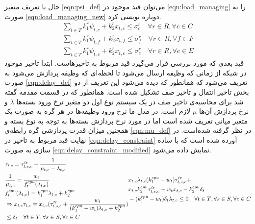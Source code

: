 	حال با تعریف متغیر \cref{eqn:psi_def} می‌توان قید موجود در \cref{eqn:load_managing} را به صورت \cref{eqn:load_managing_new} دوباره نویسی کرد. 
	\begin{subequations}\label{eqn:load_managing_new}
		\begin{align}
		\sum_{t \in T}k_1^r\psi_{t,c}+k_2^rx_{t,c} \le \sigma_c^r \quad \forall{r \in R}, \forall{c \in C} \\
		\sum_{t \in T}k_1^r\psi_{t,f}+k_2^rx_{t,f} \le \sigma_f^r \quad \forall{r \in R}, \forall{f \in F} \\
		\sum_{t \in T}k_1^r\psi_{t,e}+k_2^rx_{t,e} \le \sigma_e^r \quad \forall{r \in R}, \forall{e \in E}
		\end{align}
	\end{subequations}
	قید بعدی که مورد بررسی قرار می‌گیرد قید مربوط به تاخیرهاست. ابتدا تاخیر موجود در شبکه از زمانی که وظیفه ارسال می‌شود تا لحظه‌ای که وظیفه پردازش می‌شود به صورت \cref{eqn:delay_def} تعریف می‌شود که همانطور که دیده می‌شود این تعریف از دو بخش تاخیر انتقال و تاخیر صف تشکیل شده است. 
همانطور که در قسمت مقدمه گفته شد برای محاسبه‌ی تاخیر صف در یک سیستم نوع اول دو متغیر نرخ ورود بسته‌ها $\lambda$ و نرخ پردازش آن‌ها $\mu$ لازم است. در مدل ما نرخ ورود وظیفه‌ها در هر گره به صورت یک متغیر میانی تغریف شده است اما در مورد نرخ پردازش بسته‌ها به توجه به نوع بسته و همچنین میزان قدرت پردازشی گره رابطه‌ی \cref{eqn:mu_def} در نظر گرفته شده‌است. 
	در نهایت قید مربوط به تاخیر در \cref{eqn:delay_constraint} آورده شده است که با ساده سازی به صورت \cref{eqn:delay_constraint_modified} نمایش داده می‌شود. 
	\begin{subequations}\label{eqn:delay_def}
		\begin{align}
		&\tau_{t,c} = \tau_{t,s,c}^{tr} + \frac{1}{\mu_{t,c}-\lambda_{t,c}} \\
		&\frac{1}{\mu_{t,c}} = \frac{w_t}{f_t^{cpu}(\lambda_{t,c})} \label{eqn:mu_def}\\
		&f_t^{cpu}(\lambda_{t,c}) = k_1^{cpu}\lambda_{t,c}+k_2^{cpu} \\
		&\notag\Rightarrow x_{t,c} \tau_{t,c} = x_{t,c} (\tau_{t,s,c}^{tr} + \frac{w_t}{(k_1^{cpu}-w_t)\lambda_{t,c} + k_2^{cpu}}) \\
		&\le \delta_t \quad \forall{t \in T}, \forall{s \in S}, \forall{c \in C} \label{eqn:delay_constraint}
		\end{align}
		\begin{align}\label{eqn:delay_constraint_modified}
		&\notag x_{t,c}\lambda_{t,c}(k_1^{cpu}-w_t)\tau^{tr}_{t,s,c} + \\ 
		&\notag x_{t,c}k_2^{cpu}\tau_{t,s,c}^{tr}+w_t x_{t,c}-k_2^{cpu}\delta_t \\ &-(k_1^{cpu}-w_t)\delta_t\lambda_{t,c} \le 0 \quad \forall{t \in T}, \forall{s \in S}, \forall{c \in C}
		\end{align}
	\end{subequations}
